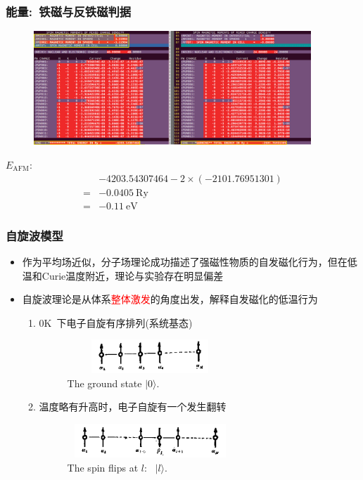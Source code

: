 \frame
{
	\frametitle{能量:~铁磁与反铁磁判据}
\vspace*{-8pt}
\begin{figure}[h!]
\centering
\includegraphics[width=4.1in]{Figures/WIEN2k_AFM_Cr-6.png}
\label{Fig:WIEN2k_AFM-Cr-6}
\end{figure}
$E_{\mathrm{AFM}}$:
\begin{displaymath}
	\begin{aligned}
		&-4203.54307464-2\times(-2101.76951301)\\
		=&-0.0405~\mathrm{Ry}\\
		=&-0.11~\mathrm{eV}
	\end{aligned}
\end{displaymath}
}

\frame
{
	\frametitle{自旋波模型}
	\begin{itemize}
		\item 作为平均场近似，分子场理论成功描述了强磁性物质的自发磁化行为，但在低温和\textrm{Curie}温度附近，理论与实验存在明显偏差
		\item 自旋波理论是从体系\textcolor{red}{整体激发}的角度出发，解释自发磁化的低温行为
			\begin{enumerate}
				\item 0\textrm{K~}下电子自旋有序排列(系统基态)
\begin{figure}[h!]
\centering
\includegraphics[height=0.50in,width=2.45in,viewport=10 10 600 150,clip]{Figures/Mag_spinwave-0.png}
\caption{\tiny \textrm{The ground state $|0\rangle$.}}%
\label{Mag_spinwave-0}
\end{figure}
				\item 温度略有升高时，电子自旋有一个发生翻转
\begin{figure}[h!]
\centering
\includegraphics[height=0.50in,width=2.45in,viewport=10 10 680 150,clip]{Figures/Mag_spinwave-1.png}
\caption{\tiny \textrm{The spin flips at $l$:~ $|l\rangle$.}}%
\label{Mag_spinwave-1}
\end{figure}
			\end{enumerate}
	\end{itemize}
}

